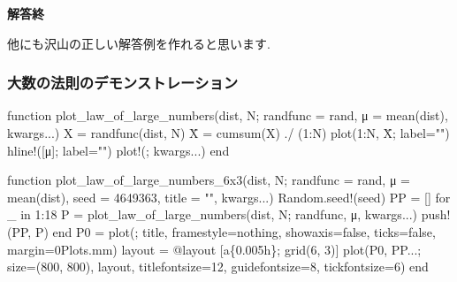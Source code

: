 \documentclass[
  letterpaper,
  DIV=11,
  numbers=noendperiod]{scrartcl}
\newenvironment{Shaded}{\begin{snugshade}}{\end{snugshade}}
\newcommand{\BuiltInTok}[1]{\textcolor[rgb]{0.00,0.23,0.31}{#1}}
\newcommand{\ConstantTok}[1]{\textcolor[rgb]{0.56,0.35,0.01}{#1}}
\newcommand{\ControlFlowTok}[1]{\textcolor[rgb]{0.00,0.23,0.31}{#1}}
\newcommand{\FloatTok}[1]{\textcolor[rgb]{0.68,0.00,0.00}{#1}}
\newcommand{\FunctionTok}[1]{\textcolor[rgb]{0.28,0.35,0.67}{#1}}
\newcommand{\KeywordTok}[1]{\textcolor[rgb]{0.00,0.23,0.31}{#1}}
\newcommand{\NormalTok}[1]{\textcolor[rgb]{0.00,0.23,0.31}{#1}}
\newcommand{\OperatorTok}[1]{\textcolor[rgb]{0.37,0.37,0.37}{#1}}
\newcommand{\PreprocessorTok}[1]{\textcolor[rgb]{0.68,0.00,0.00}{#1}}
\newcommand{\StringTok}[1]{\textcolor[rgb]{0.13,0.47,0.30}{#1}}
\begin{document}
\textbf{解答終}

他にも沢山の正しい解答例を作れると思います.

\hypertarget{ux5927ux6570ux306eux6cd5ux5247ux306eux30c7ux30e2ux30f3ux30b9ux30c8ux30ecux30fcux30b7ux30e7ux30f3}{%
\subsubsection{大数の法則のデモンストレーション}\label{ux5927ux6570ux306eux6cd5ux5247ux306eux30c7ux30e2ux30f3ux30b9ux30c8ux30ecux30fcux30b7ux30e7ux30f3}}

\begin{Shaded}
\begin{Highlighting}[]
\KeywordTok{function} \FunctionTok{plot\_law\_of\_large\_numbers}\NormalTok{(dist, N;}
\NormalTok{        randfunc }\OperatorTok{=}\NormalTok{ rand, μ }\OperatorTok{=} \FunctionTok{mean}\NormalTok{(dist), kwargs}\OperatorTok{...}\NormalTok{)}
\NormalTok{    X }\OperatorTok{=} \FunctionTok{randfunc}\NormalTok{(dist, N)}
\NormalTok{    X̄ }\OperatorTok{=} \FunctionTok{cumsum}\NormalTok{(X) }\OperatorTok{./}\NormalTok{ (}\FloatTok{1}\OperatorTok{:}\NormalTok{N)}
    \FunctionTok{plot}\NormalTok{(}\FloatTok{1}\OperatorTok{:}\NormalTok{N, X̄; label}\OperatorTok{=}\StringTok{""}\NormalTok{)}
    \FunctionTok{hline!}\NormalTok{([μ]; label}\OperatorTok{=}\StringTok{""}\NormalTok{)}
    \FunctionTok{plot!}\NormalTok{(; kwargs}\OperatorTok{...}\NormalTok{)}
\KeywordTok{end}

\KeywordTok{function} \FunctionTok{plot\_law\_of\_large\_numbers\_6x3}\NormalTok{(dist, N;}
\NormalTok{        randfunc }\OperatorTok{=}\NormalTok{ rand, μ }\OperatorTok{=} \FunctionTok{mean}\NormalTok{(dist), seed }\OperatorTok{=} \FloatTok{4649363}\NormalTok{, title }\OperatorTok{=} \StringTok{""}\NormalTok{, kwargs}\OperatorTok{...}\NormalTok{)}
    \BuiltInTok{Random}\NormalTok{.}\FunctionTok{seed!}\NormalTok{(seed)}
\NormalTok{    PP }\OperatorTok{=}\NormalTok{ []}
    \ControlFlowTok{for}\NormalTok{ \_ }\KeywordTok{in} \FloatTok{1}\OperatorTok{:}\FloatTok{18}
\NormalTok{        P }\OperatorTok{=} \FunctionTok{plot\_law\_of\_large\_numbers}\NormalTok{(dist, N; randfunc, μ, kwargs}\OperatorTok{...}\NormalTok{)}
        \FunctionTok{push!}\NormalTok{(PP, P)}
    \ControlFlowTok{end}
\NormalTok{    P0 }\OperatorTok{=} \FunctionTok{plot}\NormalTok{(; title,}
\NormalTok{        framestyle}\OperatorTok{=}\ConstantTok{nothing}\NormalTok{, showaxis}\OperatorTok{=}\ConstantTok{false}\NormalTok{, ticks}\OperatorTok{=}\ConstantTok{false}\NormalTok{, margin}\OperatorTok{=}\FloatTok{0}\NormalTok{Plots.mm)}
\NormalTok{    layout }\OperatorTok{=} \PreprocessorTok{@layout}\NormalTok{ [a\{}\FloatTok{0.005}\NormalTok{h\}; }\FunctionTok{grid}\NormalTok{(}\FloatTok{6}\NormalTok{, }\FloatTok{3}\NormalTok{)]}
    \FunctionTok{plot}\NormalTok{(P0, PP}\OperatorTok{...}\NormalTok{; size}\OperatorTok{=}\NormalTok{(}\FloatTok{800}\NormalTok{, }\FloatTok{800}\NormalTok{), layout,}
\NormalTok{        titlefontsize}\OperatorTok{=}\FloatTok{12}\NormalTok{, guidefontsize}\OperatorTok{=}\FloatTok{8}\NormalTok{, tickfontsize}\OperatorTok{=}\FloatTok{6}\NormalTok{)}
\KeywordTok{end}
\end{Highlighting}
\end{Shaded}
\end{document}
